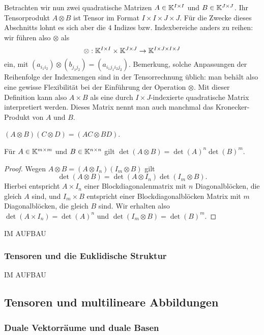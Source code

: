 	Betrachten wir nun zwei quadratische Matrizen $A \in \mathbb K^{I \times I}$ und $B \in \mathbb K^{J \times J}$. Ihr Tensorprodukt $A \otimes B$ ist Tensor im Format $I \times I \times J \times J$. Für die Zwecke dieses Abschnitts lohnt es sich aber die $4$ Indizes bzw. Indexbereiche anders zu reihen: wir führen also $\otimes$ als 
	\[
	\otimes : \mathbb K^{I \times I} \times \mathbb K^{J \times J} \to \mathbb K^{I \times J \times I \times J} 
	\]
	ein, mit $(a_{i_1 i_2} ) \otimes (b_{j_1 j_2}) = (a_{i_1 j_1 i_2 j_2})$. Bemerkung, solche Anpassungen der Reihenfolge der Indexmengen sind in der Tensorrechnung üblich: man behält also eine gewisse Flexibilität bei der Einführung der Operation $\otimes$. Mit dieser Definition kann also $A \times B$ als eine durch $I \times J$-indexierte quadratische Matrix interpretiert werden. Dieses Matrix nennt man auch manchmal das Kronecker-Produkt von $A$ und $B$. 
	
	\begin{lm}
		$(A \otimes B) (C \otimes D) = (AC \otimes BD)$. 
	\end{lm} 
	
	\begin{thm}
		Für $A \in \mathbb K^{m \times m}$ und $B \in \mathbb K^{n\times n}$ gilt $\det(A \otimes B) = \det(A)^n \det(B)^m$. 
	\end{thm} 
	\begin{proof} 
		Wegen $A \otimes B = (A \otimes I_n) (I_m  \otimes B)$ gilt 
		\[
		\det(A \otimes B) = \det(A \otimes I_n) \det (I_m \otimes B). 
		\]
		Hierbei entspricht $A \times I_n$ einer Blockdiagonalenmatrix mit $n$ Diagonalblöcken, die gleich $A$ sind, und $I_m \times B$ entspricht einer Blockdiagonalblöcken Matrix mit $m$ Diagonalblöcken, die gleich $B$ sind. Wir erhalten also $\det( A \times I_n) = \det(A)^n$ und $\det(I_m \otimes B) = \det(B)^m$. 
	\end{proof} 
	
	IM AUFBAU 
	
	\subsubsection{Tensoren und die Euklidische Struktur} 
	
	IM AUFBAU 
	
	\subsection{Tensoren und multilineare Abbildungen} 
	
	\subsubsection{Duale Vektorräume und duale Basen}
	
